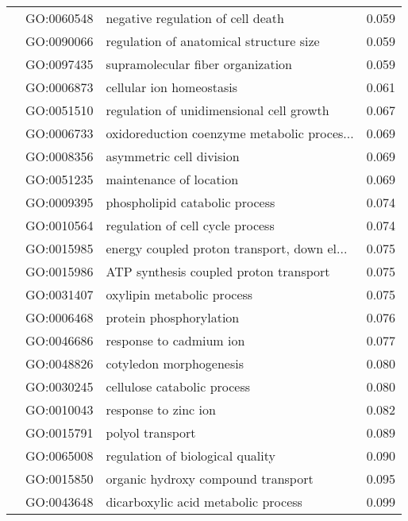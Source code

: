 \begin{longtable}{lllr}
   & GO:0060548 &            negative regulation of cell death &         0.059 \\
   & GO:0090066 &      regulation of anatomical structure size &         0.059 \\
   & GO:0097435 &            supramolecular fiber organization &         0.059 \\
   & GO:0006873 &                     cellular ion homeostasis &         0.061 \\
   & GO:0051510 &     regulation of unidimensional cell growth &         0.067 \\
   & GO:0006733 &  oxidoreduction coenzyme metabolic proces... &         0.069 \\
   & GO:0008356 &                     asymmetric cell division &         0.069 \\
   & GO:0051235 &                      maintenance of location &         0.069 \\
   & GO:0009395 &               phospholipid catabolic process &         0.074 \\
   & GO:0010564 &             regulation of cell cycle process &         0.074 \\
   & GO:0015985 &  energy coupled proton transport, down el... &         0.075 \\
   & GO:0015986 &       ATP synthesis coupled proton transport &         0.075 \\
   & GO:0031407 &                   oxylipin metabolic process &         0.075 \\
   & GO:0006468 &                      protein phosphorylation &         0.076 \\
   & GO:0046686 &                      response to cadmium ion &         0.077 \\
   & GO:0048826 &                      cotyledon morphogenesis &         0.080 \\
   & GO:0030245 &                  cellulose catabolic process &         0.080 \\
   & GO:0010043 &                         response to zinc ion &         0.082 \\
   & GO:0015791 &                             polyol transport &         0.089 \\
   & GO:0065008 &             regulation of biological quality &         0.090 \\
   & GO:0015850 &           organic hydroxy compound transport &         0.095 \\
   & GO:0043648 &          dicarboxylic acid metabolic process &         0.099 \\

\end{longtable}
